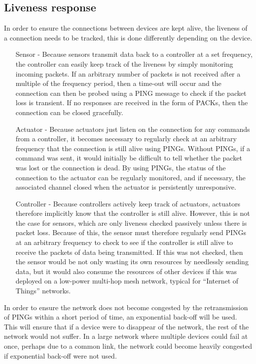 \subsection{Liveness response} %
\label{sub:liveness_response}
In order to ensure the connections between devices are kept alive, the liveness of a connection needs to be tracked, this is done differently depending on the device.
\begin{itemize}
	\item [Sensor -] Because sensors transmit data back to a controller at a set frequency, the controller can easily keep track of the liveness by simply monitoring incoming packets. If an arbitrary number of packets is not received after a multiple of the frequency period, then a time-out will occur and the connection can then be probed using a PING message to check if the packet loss is transient. If no responses are received in the form of PACKs, then the connection can be closed gracefully. 
	\item [Actuator -] Because actuators just listen on the connection for any commands from a controller, it becomes necessary to regularly check at an arbitrary frequency that the connection is still alive using PINGs. Without PINGs, if a command was sent, it would initially be difficult to tell whether the packet was lost or the connection is dead. By using PINGs, the status of the connection to the actuator can be regularly monitored, and if necessary, the associated channel closed when the actuator is persistently unresponsive.
	\item [Controller -] Because controllers actively keep track of actuators, actuators therefore implicitly know that the controller is still alive. However, this is not the case for sensors, which are only liveness checked passively unless there is packet loss. Because of this, the sensor must therefore regularly send PINGs at an arbitrary frequency to check to see if the controller is still alive to receive the packets of data being transmitted. If this was not checked, then the sensor would be not only wasting its own resources by needlessly sending data, but it would also consume the resources of other devices if this was deployed on a low-power multi-hop mesh network, typical for ``Internet of Things'' networks.
\end{itemize}

In order to ensure the network does not become congested by the retransmission of PINGs within a short period of time, an exponential back-off will be used. This will ensure that if a device were to disappear of the network, the rest of the network would not suffer. In a large network where multiple devices could fail at once, perhaps due to a common link, the network could become heavily congested if exponential back-off were not used.

